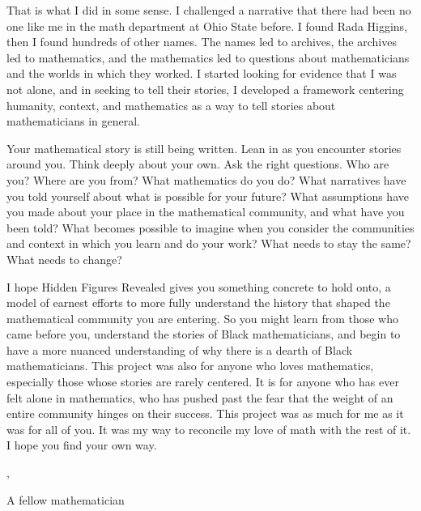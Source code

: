 \documentclass[pdflatex,sn-mathphys-num]{sn-jnl}%
\begin{document}
That is what I did in some sense. I challenged a narrative that there had been no one like me in the math department at Ohio State before. I found Rada Higgins, then I found hundreds of other names. The names led to archives, the archives led to mathematics, and the mathematics led to questions about mathematicians and the worlds in which they worked. I started looking for evidence that I was not alone, and in seeking to tell their stories, I developed a framework centering humanity, context, and mathematics as a way to tell stories about mathematicians in general.

Your mathematical story is still being written. Lean in as you encounter stories around you. Think deeply about your own. Ask the right questions. Who are you? Where are you from? What mathematics do you do? What narratives have you told yourself about what is possible for your future? What assumptions have you made about your place in the mathematical community, and what have you been told? What becomes possible to imagine when you consider the communities and context in which you learn and do your work? What needs to stay the same? What needs to change?


I hope Hidden Figures Revealed gives you something concrete to hold onto, a model of earnest efforts to more fully understand the history that shaped the mathematical community you are entering. So you might learn from those who came before you, understand the stories of Black mathematicians, and begin to have a more nuanced understanding of why there is a dearth of Black mathematicians. This project was also for anyone who loves mathematics, especially those whose stories are rarely centered. It is for anyone who has ever felt alone in mathematics, who has pushed past the fear that the weight of an entire community hinges on their success. This project was as much for me as it was for all of you. It was my way to reconcile my love of math with the rest of it. I hope you find your own way.

\bigskip

\noindent {},

\medskip

\noindent \Large{{\calligra A fellow mathematician}}






\end{document}
